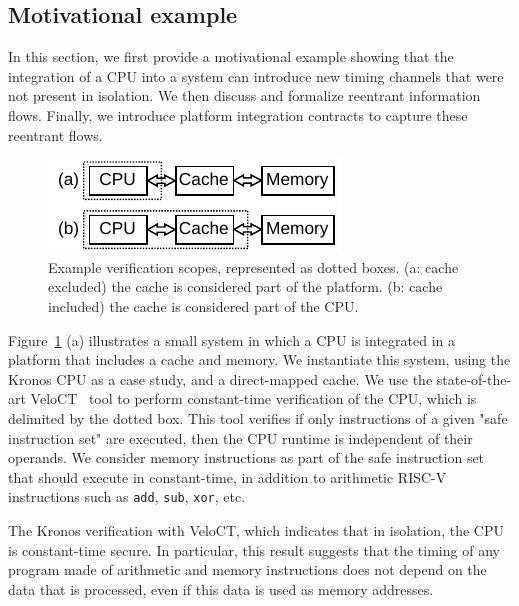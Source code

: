 \subsection{Motivational example}

In this section, we first provide a motivational example showing that the integration of a CPU into a system can introduce new timing channels that were not present in isolation.
We then discuss and formalize reentrant information flows.
Finally, we introduce platform integration contracts to capture these reentrant flows.

\begin{figure}[t]
    \begin{center}
    \includegraphics[width=0.6\columnwidth]{figures/verifscopecache/verifscopecache.pdf}
    \end{center}
    \vspace*{-1em}
    \caption{\label{fig:verifscopecache}
        Example verification scopes, represented as dotted boxes. (a: cache excluded) the cache is considered part of the platform. (b: cache included) the cache is considered part of the CPU.
    }
    \vspace*{-1em}
\end{figure}


Figure~\ref{fig:verifscopecache} (a) illustrates a small system in which a CPU is integrated in a platform that includes a cache and memory.
We instantiate this system, using the Kronos CPU as a case study, and a direct-mapped cache.
We use the state-of-the-art VeloCT~\cite{dinesh2025h} tool to perform constant-time verification of the CPU, which is delimited by the dotted box.
This tool verifies if only instructions of a given "safe instruction set" are executed, then the CPU runtime is independent of their operands.
We consider memory instructions as part of the safe instruction set that should execute in constant-time, in addition to arithmetic RISC-V instructions such as \texttt{add}, \texttt{sub}, \texttt{xor}, etc.

The Kronos verification with VeloCT, which indicates that in isolation, the CPU is constant-time secure.
In particular, this result suggests that the timing of any program made of arithmetic and memory instructions does not depend on the data that is processed, even if this data is used as memory addresses.

